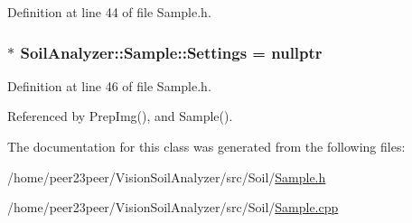 Definition at line 44 of file Sample.\+h.

\hypertarget{class_soil_analyzer_1_1_sample_a31f7b29fc46497f9b2847285c7893832}{}
\subsubsection[{Settings}]{$\ast$ Soil\+Analyzer\+::\+Sample\+::\+Settings = nullptr}\label{class_soil_analyzer_1_1_sample_a31f7b29fc46497f9b2847285c7893832}


Definition at line 46 of file Sample.\+h.



Referenced by Prep\+Img(), and Sample().



The documentation for this class was generated from the following files\+:\begin{DoxyCompactItemize}
\item 
/home/peer23peer/\+Vision\+Soil\+Analyzer/src/\+Soil/\hyperlink{_sample_8h}{Sample.\+h}\item 
/home/peer23peer/\+Vision\+Soil\+Analyzer/src/\+Soil/\hyperlink{_sample_8cpp}{Sample.\+cpp}\end{DoxyCompactItemize}
